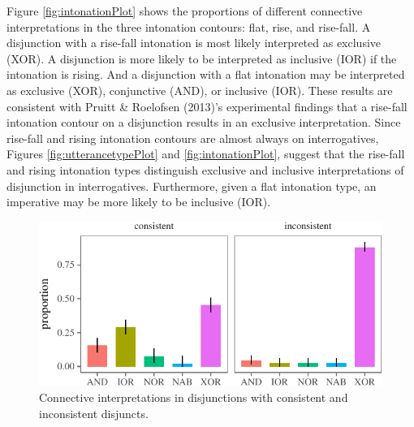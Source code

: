 \documentclass[oneside]{report}
\theoremstyle{definition}
\theoremstyle{definition}
\theoremstyle{definition}
\theoremstyle{remark}
\begin{document}
Figure \ref{fig:intonationPlot} shows the proportions of different
connective interpretations in the three intonation contours: flat, rise,
and rise-fall. A disjunction with a rise-fall intonation is most likely
interpreted as exclusive (XOR). A disjunction is more likely to be
interpreted as inclusive (IOR) if the intonation is rising. And a
disjunction with a flat intonation may be interpreted as exclusive
(XOR), conjunctive (AND), or inclusive (IOR). These results are
consistent with Pruitt \& Roelofsen (2013)'s experimental findings that
a rise-fall intonation contour on a disjunction results in an exclusive
interpretation. Since rise-fall and rising intonation contours are
almost always on interrogatives, Figures \ref{fig:utterancetypePlot} and
\ref{fig:intonationPlot}, suggest that the rise-fall and rising
intonation types distinguish exclusive and inclusive interpretations of
disjunction in interrogatives. Furthermore, given a flat intonation
type, an imperative may be more likely to be inclusive (IOR).
\begin{figure}[tb]

{\centering \includegraphics{figs/consistencyPlot-1} 

}

\caption{Connective interpretations in disjunctions with consistent and inconsistent disjuncts.}\label{fig:consistencyPlot}
\end{figure}
\newline
\end{document}

